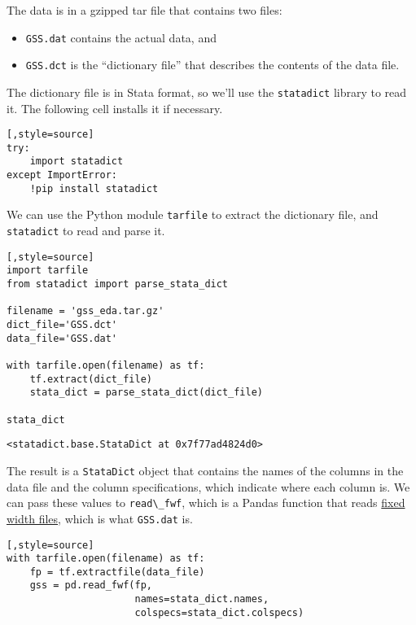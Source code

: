 The data is in a gzipped tar file that contains two files:

\begin{itemize}
\item
  \passthrough{\lstinline!GSS.dat!} contains the actual data, and
\item
  \passthrough{\lstinline!GSS.dct!} is the ``dictionary file'' that
  describes the contents of the data file.
\end{itemize}

The dictionary file is in Stata format, so we'll use the
\passthrough{\lstinline!statadict!} library to read it. The following
cell installs it if necessary.

\begin{lstlisting}[,style=source]
try:
    import statadict
except ImportError:
    !pip install statadict
\end{lstlisting}

We can use the Python module \passthrough{\lstinline!tarfile!} to
extract the dictionary file, and \passthrough{\lstinline!statadict!} to
read and parse it.

\begin{lstlisting}[,style=source]
import tarfile
from statadict import parse_stata_dict

filename = 'gss_eda.tar.gz'
dict_file='GSS.dct'
data_file='GSS.dat'

with tarfile.open(filename) as tf:
    tf.extract(dict_file)
    stata_dict = parse_stata_dict(dict_file)
        
stata_dict
\end{lstlisting}

\begin{lstlisting}[style=output]
<statadict.base.StataDict at 0x7f77ad4824d0>
\end{lstlisting}

The result is a \passthrough{\lstinline!StataDict!} object that contains
the names of the columns in the data file and the column specifications,
which indicate where each column is. We can pass these values to
\passthrough{\lstinline!read\_fwf!}, which is a Pandas function that
reads \href{https://en.wikipedia.org/wiki/Flat-file_database}{fixed
width files}, which is what \passthrough{\lstinline!GSS.dat!} is.

\begin{lstlisting}[,style=source]
with tarfile.open(filename) as tf:
    fp = tf.extractfile(data_file)  
    gss = pd.read_fwf(fp,
                      names=stata_dict.names,
                      colspecs=stata_dict.colspecs)
\end{lstlisting}

